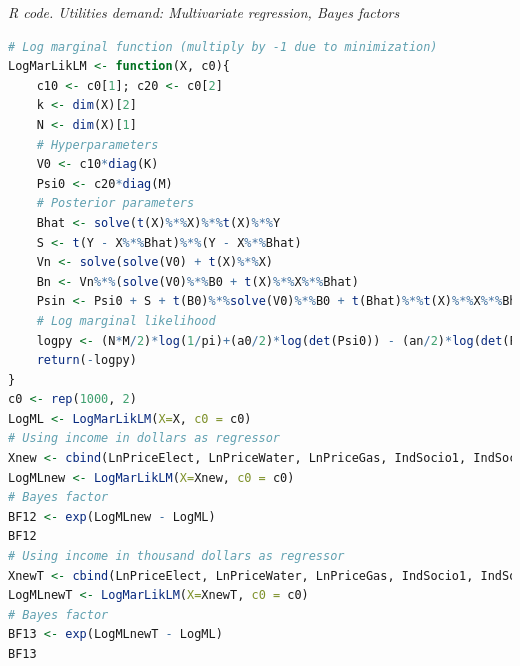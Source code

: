 \begin{enumerate}[leftmargin=*]
\begin{tcolorbox}[enhanced,width=4.67in,center upper,
	fontupper=\large\bfseries,drop shadow southwest,sharp corners]
	\textit{R code. Utilities demand: Multivariate regression, Bayes factors}
	\begin{VF}
		\begin{lstlisting}[language=R]
# Log marginal function (multiply by -1 due to minimization)
LogMarLikLM <- function(X, c0){
	c10 <- c0[1]; c20 <- c0[2]
	k <- dim(X)[2]
	N <- dim(X)[1]
	# Hyperparameters
	V0 <- c10*diag(K)
	Psi0 <- c20*diag(M)
	# Posterior parameters
	Bhat <- solve(t(X)%*%X)%*%t(X)%*%Y 
	S <- t(Y - X%*%Bhat)%*%(Y - X%*%Bhat)
	Vn <- solve(solve(V0) + t(X)%*%X) 
	Bn <- Vn%*%(solve(V0)%*%B0 + t(X)%*%X%*%Bhat)
	Psin <- Psi0 + S + t(B0)%*%solve(V0)%*%B0 + t(Bhat)%*%t(X)%*%X%*%Bhat - t(Bn)%*%solve(Vn)%*%Bn
	# Log marginal likelihood
	logpy <- (N*M/2)*log(1/pi)+(a0/2)*log(det(Psi0)) - (an/2)*log(det(Psin)) + (M/2)*(log(det(Vn)) - log(det(V0))) + lgamma(an/2)-lgamma(a0/2)
	return(-logpy)
}
c0 <- rep(1000, 2)
LogML <- LogMarLikLM(X=X, c0 = c0)
# Using income in dollars as regressor
Xnew <- cbind(LnPriceElect, LnPriceWater, LnPriceGas, IndSocio1, IndSocio2, Altitude, Nrooms, HouseholdMem, Children, exp(Lnincome), 1)
LogMLnew <- LogMarLikLM(X=Xnew, c0 = c0)
# Bayes factor
BF12 <- exp(LogMLnew - LogML)
BF12
# Using income in thousand dollars as regressor
XnewT <- cbind(LnPriceElect, LnPriceWater, LnPriceGas, IndSocio1, IndSocio2, Altitude, Nrooms, HouseholdMem, Children, exp(Lnincome)/1000, 1)
LogMLnewT <- LogMarLikLM(X=XnewT, c0 = c0)
# Bayes factor
BF13 <- exp(LogMLnewT - LogML)
BF13
		\end{lstlisting}
	\end{VF}
\end{tcolorbox} 


\end{enumerate}
